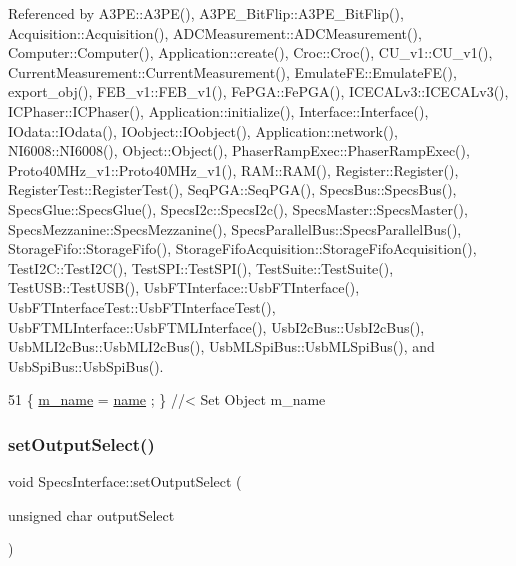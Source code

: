 Referenced by A3\+P\+E\+::\+A3\+P\+E(), A3\+P\+E\+\_\+\+Bit\+Flip\+::\+A3\+P\+E\+\_\+\+Bit\+Flip(), Acquisition\+::\+Acquisition(), A\+D\+C\+Measurement\+::\+A\+D\+C\+Measurement(), Computer\+::\+Computer(), Application\+::create(), Croc\+::\+Croc(), C\+U\+\_\+v1\+::\+C\+U\+\_\+v1(), Current\+Measurement\+::\+Current\+Measurement(), Emulate\+F\+E\+::\+Emulate\+F\+E(), export\+\_\+obj(), F\+E\+B\+\_\+v1\+::\+F\+E\+B\+\_\+v1(), Fe\+P\+G\+A\+::\+Fe\+P\+G\+A(), I\+C\+E\+C\+A\+Lv3\+::\+I\+C\+E\+C\+A\+Lv3(), I\+C\+Phaser\+::\+I\+C\+Phaser(), Application\+::initialize(), Interface\+::\+Interface(), I\+Odata\+::\+I\+Odata(), I\+Oobject\+::\+I\+Oobject(), Application\+::network(), N\+I6008\+::\+N\+I6008(), Object\+::\+Object(), Phaser\+Ramp\+Exec\+::\+Phaser\+Ramp\+Exec(), Proto40\+M\+Hz\+\_\+v1\+::\+Proto40\+M\+Hz\+\_\+v1(), R\+A\+M\+::\+R\+A\+M(), Register\+::\+Register(), Register\+Test\+::\+Register\+Test(), Seq\+P\+G\+A\+::\+Seq\+P\+G\+A(), Specs\+Bus\+::\+Specs\+Bus(), Specs\+Glue\+::\+Specs\+Glue(), Specs\+I2c\+::\+Specs\+I2c(), Specs\+Master\+::\+Specs\+Master(), Specs\+Mezzanine\+::\+Specs\+Mezzanine(), Specs\+Parallel\+Bus\+::\+Specs\+Parallel\+Bus(), Storage\+Fifo\+::\+Storage\+Fifo(), Storage\+Fifo\+Acquisition\+::\+Storage\+Fifo\+Acquisition(), Test\+I2\+C\+::\+Test\+I2\+C(), Test\+S\+P\+I\+::\+Test\+S\+P\+I(), Test\+Suite\+::\+Test\+Suite(), Test\+U\+S\+B\+::\+Test\+U\+S\+B(), Usb\+F\+T\+Interface\+::\+Usb\+F\+T\+Interface(), Usb\+F\+T\+Interface\+Test\+::\+Usb\+F\+T\+Interface\+Test(), Usb\+F\+T\+M\+L\+Interface\+::\+Usb\+F\+T\+M\+L\+Interface(), Usb\+I2c\+Bus\+::\+Usb\+I2c\+Bus(), Usb\+M\+L\+I2c\+Bus\+::\+Usb\+M\+L\+I2c\+Bus(), Usb\+M\+L\+Spi\+Bus\+::\+Usb\+M\+L\+Spi\+Bus(), and Usb\+Spi\+Bus\+::\+Usb\+Spi\+Bus().


\begin{DoxyCode}
51 \{ \hyperlink{classObject_a8b83c95c705d2c3ba0d081fe1710f48d}{m\_name}  = \hyperlink{classObject_a300f4c05dd468c7bb8b3c968868443c1}{name}  ; \} \textcolor{comment}{//< Set Object m\_name}
\end{DoxyCode}
\mbox{\label{classSpecsInterface_a1907d360f2bda367cfb1d39e379c6493}} 
\subsubsection{\texorpdfstring{set\+Output\+Select()}{setOutputSelect()}}
{\footnotesize\ttfamily void Specs\+Interface\+::set\+Output\+Select (\begin{DoxyParamCaption}\item[{unsigned char}]{output\+Select }\end{DoxyParamCaption})\hspace{0.3cm}{\ttfamily [inherited]}}



